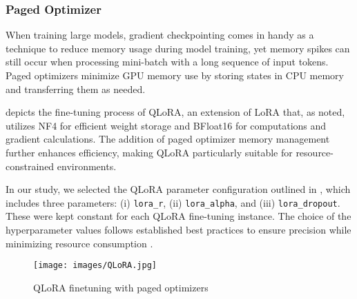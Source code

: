 \subsubsection{Paged Optimizer}

When training large models, gradient checkpointing comes in handy as a technique to reduce memory usage during model training, yet memory spikes can still occur when processing mini-batch with a long sequence of input tokens.
Paged optimizers minimize GPU memory use by storing states in CPU memory and transferring them as needed.

 depicts the fine-tuning process of QLoRA, an extension of LoRA that, as noted, utilizes NF4 for efficient weight storage and BFloat16 for computations and gradient calculations. 
The addition of paged optimizer memory management further enhances efficiency, making QLoRA particularly suitable for resource-constrained environments.

In our study, we selected the QLoRA parameter configuration outlined in , which includes three parameters: (i) \texttt{lora\_r}, (ii) \texttt{lora\_alpha}, and (iii) \texttt{lora\_dropout}. These were kept constant for each QLoRA fine-tuning instance.
The choice of the hyperparameter values follows established best practices to ensure precision while minimizing resource consumption \cite{dettmers2024qlora,hu2021lora}. 

\begin{figure}[t!]
	\centering
	\texttt{[image: images/QLoRA.jpg]}
	\caption{QLoRA finetuning with paged optimizers \cite{dettmers2024qlora}}
	\label{fig:qlora}
\end{figure}


